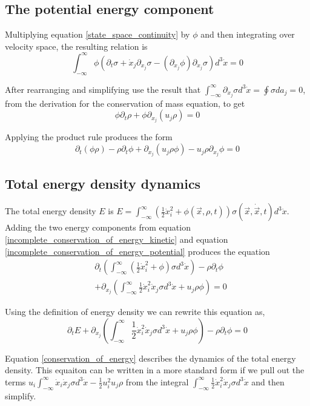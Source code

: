 \documentclass[%
preprint,
 amsmath,amssymb,
 aps,
]{revtex4-1}
\newcommand{\dvec}[1]{\dot{\vec{#1}}}
\newcommand{\intVdot}[1]{\int_{-\infty}^{\infty} #1 d^3\dot{x}}
\begin{document}
\subsection{The potential energy component}
Multiplying equation \eqref{state_space_continuity} by $\phi$ and then integrating over velocity space, the resulting relation is
\[
\intVdot{\phi\left(\partial_t \sigma + \dot{x}_j\partial_{x_j}\sigma-\left(\partial_{x_j}\phi\right)\partial_{\dot{x}_j}\sigma\right)}=0
\]

After rearranging and simplifying use the result that $\intVdot{\partial_{\dot{x}_j}\sigma}=\oint\sigma da_j = 0$, from the derivation for the conservation of mass equation, to get
\[
\phi\partial_t\rho + \phi\partial_{x_j}\left(u_j\rho\right)=0
\]

Applying the product rule produces the form
\begin{equation}
\partial_t\left(\phi\rho\right) - \rho\partial_t\phi + \partial_{x_j}\left(u_j\rho\phi\right) - u_j\rho\partial_{x_j}\phi=0
\label{incomplete_conservation_of_energy_potential}
\end{equation}


\subsection{Total energy density dynamics}
The total energy density $E$ is $E=\intVdot{\left(\frac{1}{2}\dot{x}_i^2 + \phi(\vec{x}, \rho, t)\right)\sigma(\vec{x}, \dvec{x}, t)}$. Adding the two energy components from equation \eqref{incomplete_conservation_of_energy_kinetic} and equation \eqref{incomplete_conservation_of_energy_potential} produces the equation
\[
\begin{split}
& \partial_t\left(\intVdot{\left(\frac{1}{2}\dot{x}_i^2 + \phi\right)\sigma}\right) - \rho\partial_t\phi \\& + \partial_{x_j}\left(\intVdot{\frac{1}{2}\dot{x}_i^2\dot{x}_j\sigma} + u_j\rho\phi\right)=0
\end{split}
\]

Using the definition of energy density we can rewrite this equation as, 
\begin{equation}
\partial_t E + \partial_{x_j}\left(\intVdot{\frac{1}{2}\dot{x}_i^2\dot{x}_j\sigma} + u_j\rho\phi\right) - \rho\partial_t\phi=0
\label{conservation_of_energy}
\end{equation}

Equation \eqref{conservation_of_energy} describes the dynamics of the total energy density. This equaiton can be written in a more standard form if we pull out the terms $u_i\intVdot{\dot{x}_i\dot{x}_j\sigma} - \frac{1}{2}u_i^2u_j\rho$ from the integral $\intVdot{\frac{1}{2}\dot{x}_i^2\dot{x}_j\sigma}$ and then simplify.
\end{document}
